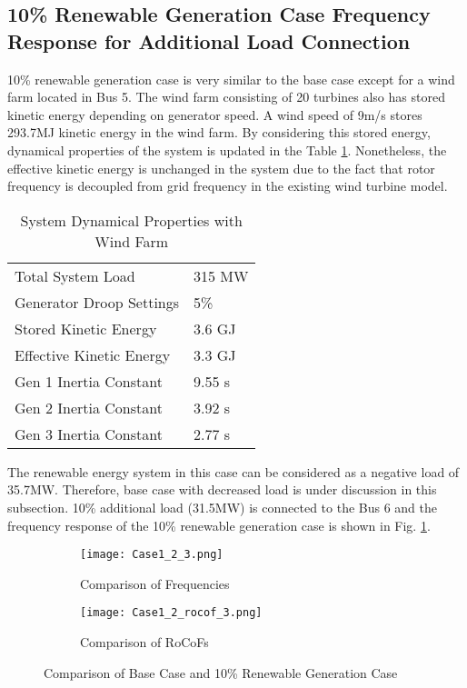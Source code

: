 \subsection{10\% Renewable Generation Case Frequency Response for Additional Load Connection}
10\% renewable generation case is very similar to the base case except for a wind farm located in Bus 5. The wind farm consisting of 20 turbines also has stored kinetic energy depending on generator speed. A wind speed of 9m/s stores 293.7MJ kinetic energy in the wind farm. By considering this stored energy, dynamical properties of the system is updated in the Table \ref{systemdynamicaldatamod}. Nonetheless, the effective kinetic energy is unchanged in the system due to the fact that rotor frequency is decoupled from grid frequency in the existing wind turbine model.\par
\begin{table}[h]
	\centering
	\begin{tabular}{ll}
		\hline
		Total System Load                      & 315 MW    \\
		Generator Droop Settings               & 5\%       \\
		Stored Kinetic Energy                  & 3.6 GJ \\
		Effective Kinetic Energy               & 3.3 GJ \\
		Gen 1 Inertia Constant                 & 9.55 s  \\
		Gen 2 Inertia Constant                 & 3.92 s  \\
		Gen 3 Inertia Constant                 & 2.77 s  \\ \hline
	\end{tabular}
	\caption{System Dynamical Properties with Wind Farm}
	\label{systemdynamicaldatamod}
\end{table}
\newpage
The renewable energy system in this case can be considered as a negative load of 35.7MW. Therefore, base case with decreased load is under discussion in this subsection. 10\% additional load (31.5MW) is connected to the Bus 6 and the frequency response of the 10\% renewable generation case is shown in Fig. \ref{Case1_2_freq}. \par
\begin{figure}[h]
	\centering
		\begin{subfigure}{0.85\textwidth} %
			\centering
		\texttt{[image: Case1\_2\_3.png]}
		\caption{Comparison of Frequencies}		
		\label{Case1_2_freq}
		\end{subfigure}
		\vspace{0.1em} %
	\begin{subfigure}{0.85\textwidth}
\centering	\texttt{[image: Case1\_2\_rocof\_3.png]}
	\caption{Comparison of RoCoFs}
	\label{Case1_2_rocof}	
	\end{subfigure}
	\caption{Comparison of Base Case and 10\% Renewable Generation Case}
\end{figure}
